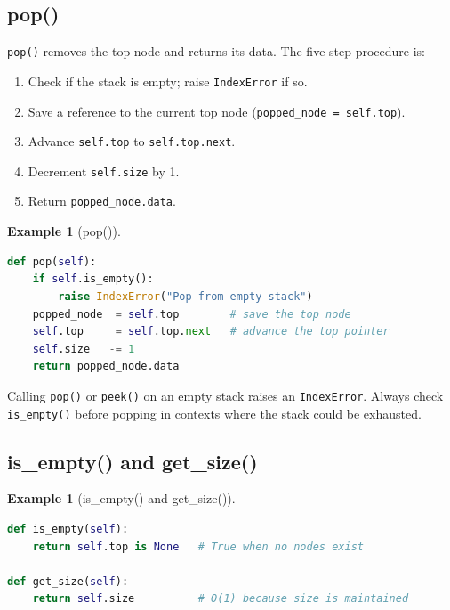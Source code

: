 \documentclass[11pt, a4paper, notitlepage]{report}
\theoremstyle{definition}
\theoremstyle{remark}
\theoremstyle{definition}
\newtheorem{example}[theorem]{Example}
\begin{document}
\subsection{pop()}
\label{subsec:stack-pop}

\texttt{pop()} removes the top node and returns its data. The five-step procedure is:

\begin{enumerate}
  \item Check if the stack is empty; raise \texttt{IndexError} if so.
  \item Save a reference to the current top node (\texttt{popped\_node = self.top}).
  \item Advance \texttt{self.top} to \texttt{self.top.next}.
  \item Decrement \texttt{self.size} by 1.
  \item Return \texttt{popped\_node.data}.
\end{enumerate}

\begin{example}[pop()]
\label{ex:stack-pop}
\leavevmode
\begin{lstlisting}[language=Python]
def pop(self):
    if self.is_empty():
        raise IndexError("Pop from empty stack")
    popped_node  = self.top        # save the top node
    self.top     = self.top.next   # advance the top pointer
    self.size   -= 1
    return popped_node.data
\end{lstlisting}
\end{example}

\begin{warning}[title={Warning: Popping from an Empty Stack}]
Calling \texttt{pop()} or \texttt{peek()} on an empty stack raises an
\texttt{IndexError}. Always check \texttt{is\_empty()} before popping in
contexts where the stack could be exhausted.
\end{warning}

\subsection{is\_empty() and get\_size()}
\label{subsec:stack-utils}

\begin{example}[is\_empty() and get\_size()]
\label{ex:stack-utils}
\leavevmode
\begin{lstlisting}[language=Python]
def is_empty(self):
    return self.top is None   # True when no nodes exist

def get_size(self):
    return self.size          # O(1) because size is maintained
\end{lstlisting}
\end{example}
\end{document}
